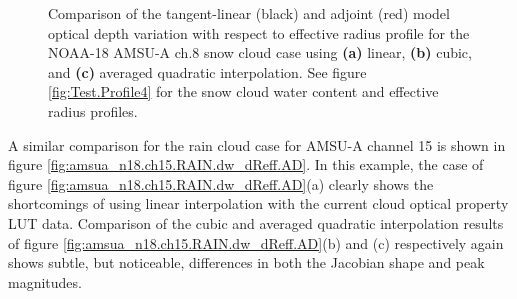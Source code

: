 \begin{figure}[htp]
\begin{tabular}{c c c}
  \end{tabular}
  \caption{Comparison of the tangent-linear (black) and adjoint (red) model optical depth variation with respect to effective radius profile for the NOAA-18 AMSU-A ch.8 snow cloud case using \textbf{(a)} linear, \textbf{(b)} cubic, and \textbf{(c)} averaged quadratic interpolation. See figure \ref{fig:Test.Profile4} for the snow cloud water content and effective radius profiles.}
  \label{fig:amsua_n18.ch8.SNOW.dOd_dReff.AD}
\end{figure}

A similar comparison for the rain cloud case for AMSU-A channel 15 is shown in figure \ref{fig:amsua_n18.ch15.RAIN.dw_dReff.AD}. In this example, the case of figure \ref{fig:amsua_n18.ch15.RAIN.dw_dReff.AD}(a) clearly shows the shortcomings of using linear interpolation with the current cloud optical property LUT data. Comparison of the cubic and averaged quadratic interpolation results of figure \ref{fig:amsua_n18.ch15.RAIN.dw_dReff.AD}(b) and (c) respectively again shows subtle, but noticeable, differences in both the Jacobian shape and peak magnitudes.
